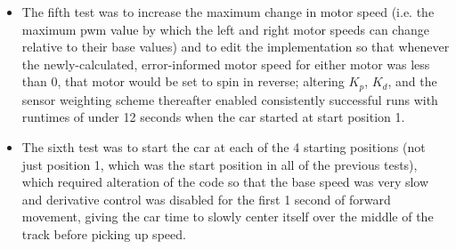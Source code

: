 \documentclass{article}
\begin{document}
\begin{itemize}
    \item The fifth test was to increase the maximum change in motor speed (i.e. the maximum pwm value by which the left and right motor speeds can change relative to their base values) and to edit the implementation so that whenever the newly-calculated, error-informed motor speed for either motor was less than 0, that motor would be set to spin in reverse; altering \(K_p\), \(K_d\), and the sensor weighting scheme thereafter enabled consistently successful runs with runtimes of under 12 seconds when the car started at start position 1.
    
    \item The sixth test was to start the car at each of the 4 starting positions (not just position 1, which was the start position in all of the previous tests), which required alteration of the code so that the base speed was very slow and derivative control was disabled for the first 1 second of forward movement, giving the car time to slowly center itself over the middle of the track before picking up speed.
    
    
    
    
    
    
    
\end{itemize}
\end{document}
